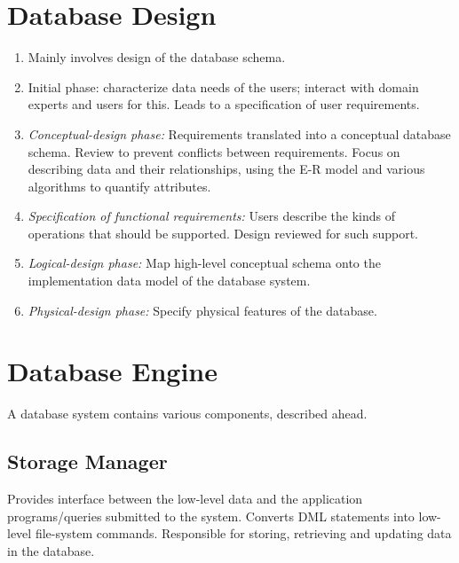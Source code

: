 \documentclass[journal,12pt,twocolumn]{IEEEtran}
\begin{document}
\section{Database Design}

\begin{enumerate}
    \item Mainly involves design of the database schema.
    \item Initial phase: characterize data needs of the users; interact with 
    domain experts and users for this. Leads to a specification of user 
    requirements.
    \item \textit{Conceptual-design phase:} Requirements translated into a 
    conceptual database schema. Review to prevent conflicts between requirements.
    Focus on describing data and their relationships, using the E-R model and 
    various algorithms to quantify attributes.
    \item \textit{Specification of functional requirements:} Users describe the 
    kinds of operations that should be supported. Design reviewed for such support.
    \item \textit{Logical-design phase:} Map high-level conceptual schema onto 
    the implementation data model of the database system.
    \item \textit{Physical-design phase:} Specify physical features of the database.
\end{enumerate}

\section{Database Engine}

A database system contains various components, described ahead.

\subsection{Storage Manager}

Provides interface between the low-level data and the application 
programs/queries submitted to the system. Converts DML statements into low-level
file-system commands. Responsible for storing, retrieving and updating data in
the database.
\end{document}
